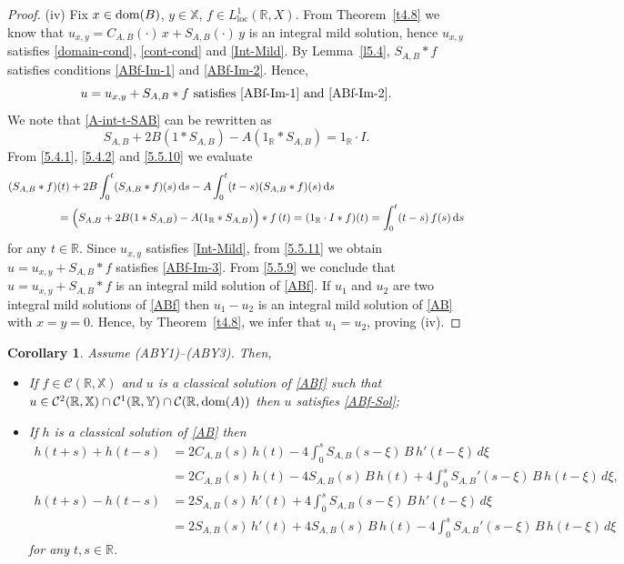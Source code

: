 \documentclass[11pt]{amsart}
\numberwithin{equation}{section}
\newcommand{\RR}{{\mathbb R}}
\newcommand{\rmd}{{\mathrm{d}}}
\newtheorem{corollary}[theorem]{Corollary}
\theoremstyle{remark}
\theoremstyle{definition}
\newcommand\bX{{\mathbb X}}
\newcommand\bY{{\mathbb Y}}
\newcommand{\dom}{\text{\rm{dom}}}
\begin{document}
\begin{proof}
	(iv) Fix $x \in \dom(B)$, $y \in \bX$, $f \in L^1_{\mathrm{loc}}(\mathbb{R}, X)$. From Theorem~\ref{t4.8} we know that $u_{x,y} = C_{A,B}(\cdot)\,x + S_{A,B}(\cdot)\,y$ is an integral mild solution, hence $u_{x,y}$ satisfies \eqref{domain-cond}, \eqref{cont-cond} and \eqref{Int-Mild}. By Lemma~\ref{l5.4}, $S_{A,B} * f$ satisfies conditions \eqref{ABf-Im-1} and \eqref{ABf-Im-2}. Hence,
	\begin{equation}\label{5.5.9}
		u = u_{x,y} + S_{A,B} * f \text{ satisfies } \eqref{ABf-Im-1} \text{ and } \eqref{ABf-Im-2}.
	\end{equation}
	We note that \eqref{A-int-t-SAB} can be rewritten as
	\begin{equation}\label{5.5.10}
		S_{A,B} + 2B(1 * S_{A,B}) - A(1_{\mathbb{R}} * S_{A,B}) = 1_{\mathbb{R}} \cdot I.
	\end{equation}
	From \eqref{5.4.1}, \eqref{5.4.2} and \eqref{5.5.10} we evaluate
	\begin{align}\label{5.5.11}
		(S_{A,B} * f)&(t)+2B\int_0^t (S_{A,B} * f)(s)\,\rmd s - A\int_0^t (t-s)(S_{A,B} * f)(s)\,\rmd s \nonumber\\
		&= \Bigl(S_{A,B} + 2B(1 * S_{A,B}) - A(1_{\mathbb{R}} * S_{A,B})\Bigr) * f\,(t) = (1_{\mathbb{R}} \cdot I * f)(t) = \int_0^t (t-s)\,f(s)\,\rmd s 
	\end{align}
	for any $t \in \mathbb{R}$. Since $u_{x,y}$ satisfies \eqref{Int-Mild}, from \eqref{5.5.11} we obtain $u = u_{x,y} + S_{A,B} * f$ satisfies \eqref{ABf-Im-3}. From \eqref{5.5.9}  we conclude that $u = u_{x,y} + S_{A,B} * f$ is an integral mild solution of \eqref{ABf}. If $u_1$ and $u_2$ are two integral mild solutions of \eqref{ABf} then $u_1 - u_2$ is an integral mild solution of \eqref{AB} with $x = y = 0$. Hence, by Theorem~\ref{t4.8}, we infer that $u_1 = u_2$, proving (iv).
\end{proof}
\begin{corollary}\label{c5.6}
	Assume \textnormal{(ABY1)--(ABY3)}. Then,
	\begin{itemize}
		\item[(i)] If $f\in\mathcal{C}(\RR,\bX)$ and $u$ is a classical solution of \eqref{ABf} such that $u\in\mathcal{C}^2(\mathbb{R}, \bX) \cap \mathcal{C}^1(\mathbb{R}, \bY) \cap \mathcal{C}(\mathbb{R}, \dom(A))$ then $u$ satisfies \eqref{ABf-Sol}; 
		\item[(ii)] If $h$ is a classical solution of \eqref{AB} then
		\begin{align}\label{5.6.7}  
			h(t+s) + h(t-s)&= 2C_{A,B}(s)\,h(t) - 4\int_0^s S_{A,B}(s-\xi)\,B\,h'(t-\xi)\,d\xi\nonumber\\
			&=2C_{A,B}(s)\,h(t)-4S_{A,B}(s)\,B\,h(t) +4 \int_0^s S_{A,B}'(s-\xi)\,B\,h(t-\xi)\,d\xi,
		\end{align}
		\begin{align}\label{5.6.8} 
			h(t+s) - h(t-s)&= 2S_{A,B}(s)\,h'(t) + 4\int_0^s S_{A,B}(s-\xi)\,B\,h'(t-\xi)\,d\xi\nonumber\\
			&=2S_{A,B}(s)\,h'(t)+4S_{A,B}(s)\,B\,h(t)-4 \int_0^s S_{A,B}'(s-\xi)\,B\,h(t-\xi)\,d\xi 
		\end{align}
		for any $t, s \in \mathbb{R}$.
	\end{itemize}
\end{corollary}
\end{document}
